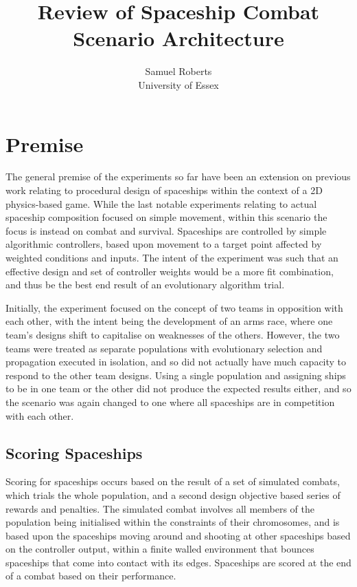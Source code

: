 \documentclass[a4paper]{article}
\begin{document}
\title{Review of Spaceship Combat Scenario Architecture}
\author{Samuel Roberts\\University of Essex}
\maketitle

\section{Premise}

The general premise of the experiments so far have been an extension on previous work relating to procedural design of spaceships within the context of a 2D physics-based game. While the last notable experiments relating to actual spaceship composition focused on simple movement, within this scenario the focus is instead on combat and survival. Spaceships are controlled by simple algorithmic controllers, based upon movement to a target point affected by weighted conditions and inputs. The intent of the experiment was such that an effective design and set of controller weights would be a more fit combination, and thus be the best end result of an evolutionary algorithm trial.

Initially, the experiment focused on the concept of two teams in opposition with each other, with the intent being the development of an arms race, where one team's designs shift to capitalise on weaknesses of the others. However, the two teams were treated as separate populations with evolutionary selection and propagation executed in isolation, and so did not actually have much capacity to respond to the other team designs. Using a single population and assigning ships to be in one team or the other did not produce the expected results either, and so the scenario was again changed to one where all spaceships are in competition with each other.

\subsection{Scoring Spaceships}

Scoring for spaceships occurs based on the result of a set of simulated combats, which trials the whole population, and a second design objective based series of rewards and penalties.
The simulated combat involves all members of the population being initialised within the constraints of their chromosomes, and is based upon the spaceships moving around and shooting at other spaceships based on the controller output, within a finite walled environment that bounces spaceships that come into contact with its edges. Spaceships are scored at the end of a combat based on their performance. 
\end{document}
